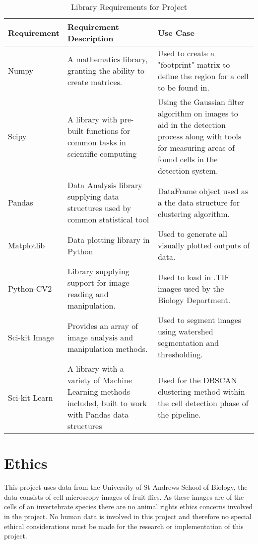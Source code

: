 \documentclass[12pt a4paper]{article}
\begin{document}
\begin{table}[H]
    \centering%
    \caption{Library Requirements for Project}
    \begin{tabular}{p{}|
                    p{}|
                    p{}
                  }
        \hline Requirement & Requirement Description & Use Case \\ \hline \hline
        Numpy & A mathematics library, granting the ability to create matrices. &  Used to create a "footprint" matrix to define the region for a cell to be found in.\\ \hline
        Scipy & A library with pre-built functions for common tasks in scientific computing & Using the Gaussian filter algorithm on images to aid in the detection process along with tools for measuring areas of found cells in the detection system.\\ \hline
        Pandas & Data Analysis library supplying data structures used by common statistical tool & DataFrame object used as a the data structure for clustering algorithm.\\ \hline
        Matplotlib & Data plotting library in Python &  Used to generate all visually plotted outputs of data.\\ \hline
        Python-CV2 & Library supplying support for image reading and manipulation. & Used to load in .TIF images used by the Biology Department. \\ \hline
        Sci-kit Image & Provides an array of image analysis and manipulation methods.  & Used to segment images using watershed segmentation and thresholding.\\ \hline
        Sci-kit Learn & A library with a variety of Machine Learning methods included, built to work with Pandas data structures & Used for the DBSCAN clustering method within the cell detection phase of the pipeline. 
        \label{table:libReq}
    \end{tabular}
\end{table}

\newpage
\section{Ethics}
This project uses data from the University of St Andrews School of Biology, the data consists of cell microscopy images of fruit flies. As these images are of the cells of an invertebrate species there are no animal rights ethics concerns involved in the project. No human data is involved in this project and therefore no special ethical considerations must be made for the research or implementation of this project.
\end{document}
